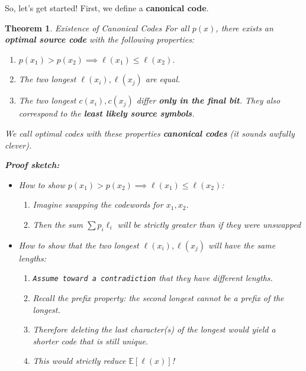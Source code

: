 \documentclass[a4paper,12pt]{report}
\newtheorem{theorem}{Theorem}
\begin{document}
So, let's get started! First, we define a \textbf{canonical code}.
\begin{theorem}{Existence of Canonical Codes}
For all $p(x)$, there exists an \textbf{optimal source code} with the following
properties: 
\begin{enumerate}
\item $p(x_1) > p(x_2) \implies \ell(x_1) \leq \ell(x_2)$.
\item The two longest $\ell(x_i), \ell(x_j)$ are equal. 
\item The two longest $c(x_i), c(x_j)$ differ \textbf{only in the final bit}.
They also correspond to the \textbf{least likely source symbols}.
\end{enumerate}

We call optimal codes with these properties \textbf{canonical codes} (it sounds
awfully clever).

\textbf{Proof sketch:} 
\begin{itemize}
\item How to show $p(x_1) > p(x_2) \implies \ell(x_1) \leq \ell(x_2)$: 
	\begin{enumerate}
	\item Imagine swapping the codewords for $x_1, x_2$. 
	\item Then the sum $\sum p_i \ell_i$ will be strictly greater than if they
	were unswapped \qedsymbol{}
	\end{enumerate}

\item How to show that the two longest $\ell(x_i), \ell(x_j)$ will have the same
lengths: 
	\begin{enumerate}
	\item \texttt{Assume toward a contradiction} that they have different
	lengths. 
	\item Recall the prefix property: the second longest cannot be a prefix of
	the longest. 
	\item Therefore deleting the last character(s) of the longest would yield a
	shorter code that is still unique.
	\item This would strictly reduce $\mathbb E[\ell(x)]$! \qedsymbol{}
	\end{enumerate}


\end{itemize}
\end{theorem}
\end{document}
